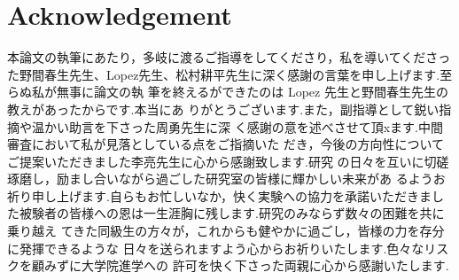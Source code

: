 \chapter*{Acknowledgement}
本論文の執筆にあたり，多岐に渡るご指導をしてくださり，私を導いてくださった野間春生先生、Lopez先生、松村耕平先生に深く感謝の言葉を申し上げます.至らぬ私が無事に論文の執 筆を終えるができたのは Lopez 先生と野間春生先生の教えがあったからです.本当にあ りがとうございます.また，副指導として鋭い指摘や温かい助言を下さった周勇先生に深 く感謝の意を述べさせて頂xます.中間審査において私が見落としている点をご指摘いた だき，今後の方向性についてご提案いただきました李亮先生に心から感謝致します.研究 の日々を互いに切磋琢磨し，励まし合いながら過ごした研究室の皆様に輝かしい未来があ るようお祈り申し上げます.自らもお忙しいなか，快く実験への協力を承諾いただきまし た被験者の皆様への恩は一生涯胸に残します.研究のみならず数々の困難を共に乗り越え てきた同級生の方々が，これからも健やかに過ごし，皆様の力を存分に発揮できるような 日々を送られますよう心からお祈りいたします.色々なリスクを顧みずに大学院進学への 許可を快く下さった両親に心から感謝いたします.
